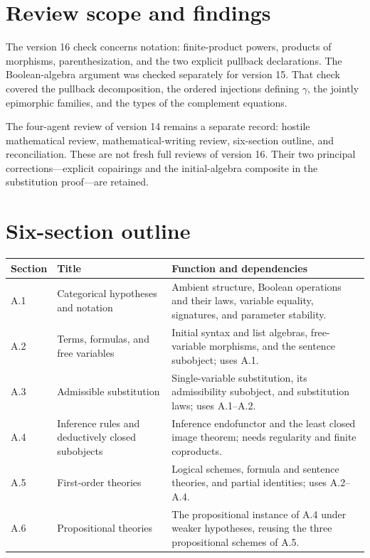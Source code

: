 \documentclass[10pt]{article}
\begin{document}
\section*{Review scope and findings}
The version 16 check concerns notation: finite-product powers, products of
morphisms, parenthesization, and the two explicit pullback declarations. The
Boolean-algebra argument was checked separately for version 15. That check
covered the pullback decomposition, the ordered injections defining $\gamma$,
the jointly epimorphic families, and the types of the complement equations.

The four-agent review of version 14 remains a separate record: hostile
mathematical review, mathematical-writing review, six-section outline, and
reconciliation. These are not fresh full reviews of version 16. Their two
principal corrections---explicit copairings and the initial-algebra composite
in the substitution proof---are retained.

\newpage
\section*{Six-section outline}
\renewcommand{\arraystretch}{1.15}
\begin{tabularx}{\textwidth}{@{}p{}>{\raggedright\arraybackslash}p{}Y@{}}
\toprule
Section & Title & Function and dependencies\\\midrule
A.1 & Categorical hypotheses and notation & Ambient structure, Boolean
operations and their laws, variable equality, signatures, and parameter stability.\\
A.2 & Terms, formulas, and free variables & Initial syntax and list algebras,
free-variable morphisms, and the sentence subobject; uses A.1.\\
A.3 & Admissible substitution & Single-variable substitution, its admissibility
subobject, and substitution laws; uses A.1--A.2.\\
A.4 & Inference rules and deductively closed subobjects & Inference endofunctor
and the least closed image theorem; needs regularity and finite coproducts.\\
A.5 & First-order theories & Logical schemes, formula and sentence theories,
and partial identities; uses A.2--A.4.\\
A.6 & Propositional theories & The propositional instance of A.4 under weaker
hypotheses, reusing the three propositional schemes of A.5.\\\bottomrule
\end{tabularx}
\end{document}
